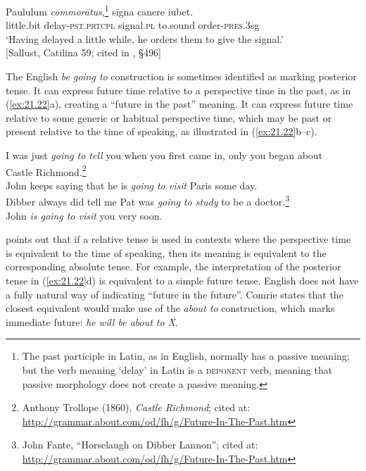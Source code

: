 \ea \label{ex:21.21}
Paululum  \textit{commorātus},\footnote{The past participle in Latin, as in English, normally has a passive meaning; but the verb meaning ‘delay’ in Latin is a \textsc{deponent} verb, meaning that passive morphology does not create a passive meaning.}  sīgna  canere  iubet.\\
little.bit  delay-\textsc{pst.prtcpl}  signal.\textsc{pl}  to.sound  order-\textsc{pres.3}sg\\
‘Having delayed a little while, he orders them to give the signal.’\\
{}[Sallust, Catilina 59; cited in \citealt{AllenGreenough1931}, §496]
\z


The English \textit{be} \textit{going to} construction is sometimes identified as marking posterior tense. It can express future time relative to a perspective time in the past, as in (\ref{ex:21.22}a), creating a “future in the past” meaning. It can express future time relative to some generic or habitual perspective time, which may be past or present relative to the time of speaking, as illustrated in (\ref{ex:21.22}b--c).


\ea \label{ex:21.22}
\ea  I was just \textit{going to tell} you when you first came in, only you began about\\
  Castle Richmond.\footnote{Anthony  Trollope (1860), \textit{Castle Richmond}; cited at: \url{http://grammar.about.com/od/fh/g/Future-In-The-Past.htm}} \\
\ex John keeps saying that he is \textit{going to visit} Paris some day.\\
\ex Dibber always did tell me Pat was \textit{going to study} to be a doctor.\footnote{John Fante, “Horselaugh on Dibber Lannon”; cited at: \url{http://grammar.about.com/od/fh/g/Future-In-The-Past.htm}} \\
\ex John \textit{is going to visit} you very soon.
                       \z
\z


\citet{Comrie1985} points out that if a relative tense is used in contexts where the perspective time is equivalent to the time of speaking, then its meaning is equivalent to the corresponding absolute tense. For example, the interpretation of the posterior tense in (\ref{ex:21.22}d) is equivalent to a simple future tense. English does not have a fully natural way of indicating “future in the future”. Comrie states that the closest equivalent would make use of the \textit{about to} construction, which marks immediate future: \textit{he will be about to X}. 


